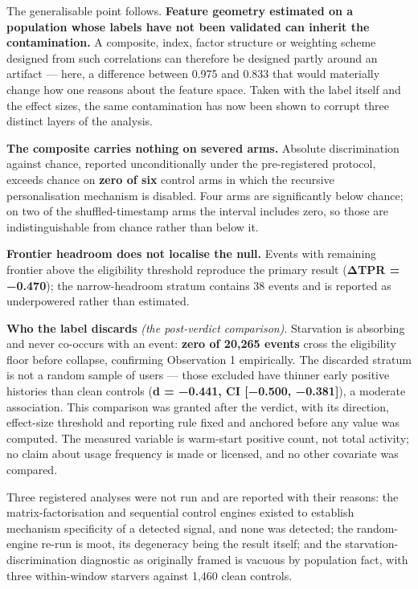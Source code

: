 \documentclass[
  11pt,
]{article}
\newcounter{none} %
\begin{document}
The generalisable point follows. \textbf{Feature geometry estimated on a
population whose labels have not been validated can inherit the
contamination.} A composite, index, factor structure or weighting scheme
designed from such correlations can therefore be designed partly around
an artifact --- here, a difference between 0.975 and 0.833 that would
materially change how one reasons about the feature space. Taken with
the label itself and the effect sizes, the same contamination has now
been shown to corrupt three distinct layers of the analysis.

\textbf{The composite carries nothing on severed arms.} Absolute
discrimination against chance, reported unconditionally under the
pre-registered protocol, exceeds chance on \textbf{zero of six} control
arms in which the recursive personalisation mechanism is disabled. Four
arms are significantly below chance; on two of the shuffled-timestamp
arms the interval includes zero, so those are indistinguishable from
chance rather than below it.

\textbf{Frontier headroom does not localise the null.} Events with
remaining frontier above the eligibility threshold reproduce the primary
result (\textbf{ΔTPR = −0.470}); the narrow-headroom stratum contains 38
events and is reported as underpowered rather than estimated.

\textbf{Who the label discards} \emph{(the post-verdict comparison)}.
Starvation is absorbing and never co-occurs with an event: \textbf{zero
of 20,265 events} cross the eligibility floor before collapse,
confirming Observation 1 empirically. The discarded stratum is not a
random sample of users --- those excluded have thinner early positive
histories than clean controls (\textbf{d = −0.441, CI {[}−0.500,
−0.381{]}}), a moderate association. This comparison was granted after
the verdict, with its direction, effect-size threshold and reporting
rule fixed and anchored before any value was computed. The measured
variable is warm-start positive count, not total activity; no claim
about usage frequency is made or licensed, and no other covariate was
compared.

Three registered analyses were not run and are reported with their
reasons: the matrix-factorisation and sequential control engines existed
to establish mechanism specificity of a detected signal, and none was
detected; the random-engine re-run is moot, its degeneracy being the
result itself; and the starvation-discrimination diagnostic as
originally framed is vacuous by population fact, with three
within-window starvers against 1,460 clean controls.
\end{document}
